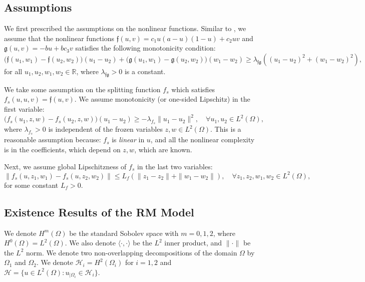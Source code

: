 \documentclass[11pt]{article}
\begin{document}
\subsection{Assumptions}
We first prescribed the assumptions on the nonlinear functions. Similar to \cite{ratti2019posteriori}, we  assume that the nonlinear functions \(\mathfrak {f}(u, v)=c_1u(a-u)(1-u) + c_2uv \) and \(\mathfrak {g }(u, v)= -bu + bc_3v\) satisfies the following  monotonicity condition:
\begin{equation}\label{monotone_fg}
\big(\mathfrak{f}(u_1, w_1) - \mathfrak{f}(u_2, w_2)\big)(u_1 - u_2) + \big(\mathfrak{g}(u_1, w_1) - \mathfrak{g}(u_2, w_2)\big)(w_1 - w_2)
\geq \lambda_{\mathfrak{f}\mathfrak{g}} \left( (u_1 - u_2)^2 + (w_1 - w_2)^2 \right),
\end{equation}
for all $u_1, u_2, w_1, w_2 \in \mathbb{R}$, where \( \lambda_{\mathfrak{f}\mathfrak{g}} > 0 \) is a constant.

We take some assumption on the splitting function $f_s$ which satisfies $f_s(u, u, v)=\mathfrak{f}(u, v)$. We assume monotonicity (or one-sided Lipschitz) in the first variable:
  \begin{equation}\label{osL_fs}
    \big(f_s(u_1, z, w) - f_s(u_2, z, w)\big)(u_1 - u_2) \geq -\lambda_{f_s} \|u_1 - u_2\|^2, \quad \forall u_1, u_2 \in L^2(\Omega),
  \end{equation}
  where $\lambda_{f_s} > 0$ is independent of the frozen variables $z, w \in L^2(\Omega)$. 
 This is a reasonable assumption because:
     $f_s$ is \emph{linear} in $u$,
    and all the nonlinear complexity is in the coefficients, which depend on $z, w$, which are known.

    Next, we assume global Lipschitzness of $f_s$ in the last two variables: 
    \begin{equation}\label{lip_fs}
    \| f_s(u, z_1, w_1) - f_s(u, z_2, w_2) \| \leq L_f \left( \| z_1 - z_2 \| + \| w_1 - w_2 \| \right), \quad \forall z_1, z_2, w_1, w_2 \in L^2(\Omega),
  \end{equation}
  for some constant $L_f > 0$. 

\subsection{Existence Results of the RM Model} %
We denote $H^m(\Omega)$ be the standard Sobolev space with $m=0,1,2$, where $H^0(\Omega)=L^2(\Omega)$. We also denote $\langle \cdot, \cdot \rangle$ be the $L^2$ inner product, and $\parallel \cdot \parallel$ be the $L^2$ norm. 
We denote two non-overlapping decompositions of the domain $\Omega$ by $\Omega_1$ and $\Omega_2$.
We denote $\mathcal{H}_i=H^2(\Omega_i)$ for $i=1, 2$ and $\mathcal{H}=\{ u\in L^2(\Omega): u_{|\Omega_i} \in \mathcal{H}_i\}$.
\end{document}
